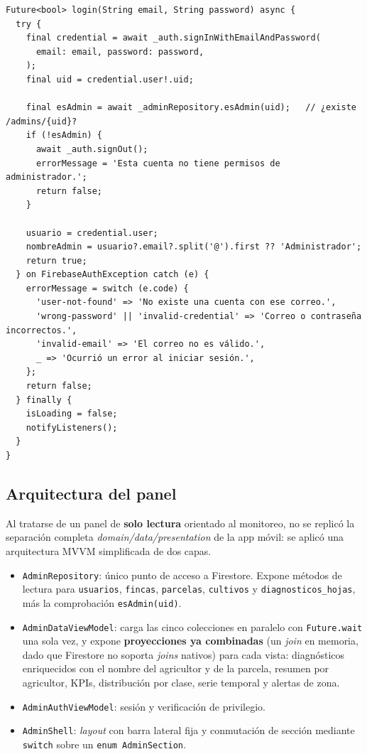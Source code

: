 \documentclass[12pt,a4paper]{article}
\begin{document}
\begin{lstlisting}[caption={Verificación de privilegio de administrador}, label={lst:adminauth}]
Future<bool> login(String email, String password) async {
  try {
    final credential = await _auth.signInWithEmailAndPassword(
      email: email, password: password,
    );
    final uid = credential.user!.uid;

    final esAdmin = await _adminRepository.esAdmin(uid);   // ¿existe /admins/{uid}?
    if (!esAdmin) {
      await _auth.signOut();
      errorMessage = 'Esta cuenta no tiene permisos de administrador.';
      return false;
    }

    usuario = credential.user;
    nombreAdmin = usuario?.email?.split('@').first ?? 'Administrador';
    return true;
  } on FirebaseAuthException catch (e) {
    errorMessage = switch (e.code) {
      'user-not-found' => 'No existe una cuenta con ese correo.',
      'wrong-password' || 'invalid-credential' => 'Correo o contraseña incorrectos.',
      'invalid-email' => 'El correo no es válido.',
      _ => 'Ocurrió un error al iniciar sesión.',
    };
    return false;
  } finally {
    isLoading = false;
    notifyListeners();
  }
}
\end{lstlisting}

\subsection{Arquitectura del panel}

Al tratarse de un panel de \textbf{solo lectura} orientado al monitoreo, no se
replicó la separación completa \textit{domain/data/presentation} de la app
móvil: se aplicó una arquitectura MVVM simplificada de dos capas.

\begin{itemize}
  \item \texttt{AdminRepository}: único punto de acceso a Firestore. Expone
        métodos de lectura para \texttt{usuarios}, \texttt{fincas},
        \texttt{parcelas}, \texttt{cultivos} y \texttt{diagnosticos\_hojas}, más
        la comprobación \texttt{esAdmin(uid)}.
  \item \texttt{AdminDataViewModel}: carga las cinco colecciones en paralelo con
        \texttt{Future.wait} una sola vez, y expone \textbf{proyecciones ya
        combinadas} (un \textit{join} en memoria, dado que Firestore no soporta
        \textit{joins} nativos) para cada vista: diagnósticos enriquecidos con el
        nombre del agricultor y de la parcela, resumen por agricultor, KPIs,
        distribución por clase, serie temporal y alertas de zona.
  \item \texttt{AdminAuthViewModel}: sesión y verificación de privilegio.
  \item \texttt{AdminShell}: \textit{layout} con barra lateral fija y conmutación
        de sección mediante \texttt{switch} sobre un \texttt{enum AdminSection}.
\end{itemize}
\end{document}
